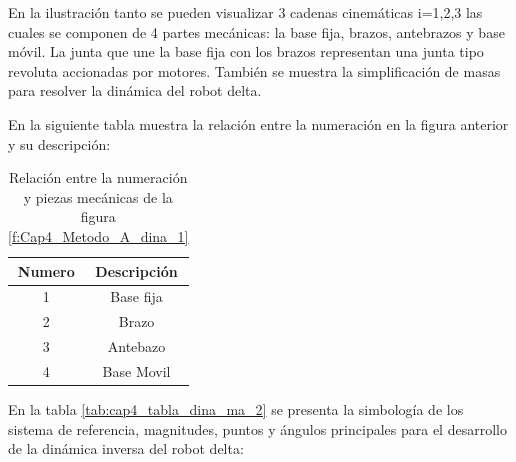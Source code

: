 En la ilustración tanto se pueden visualizar 3 cadenas cinemáticas i=1,2,3 las cuales se componen de 4 partes mecánicas: la base fija, brazos, antebrazos y base móvil. La junta que une la base fija con los brazos representan una junta tipo revoluta accionadas por motores. También se muestra la simplificación de masas para resolver la dinámica del robot delta.

En la siguiente tabla muestra la relación entre la numeración en la figura anterior y su descripción:


        \begin{table}[h]
            \centering
            \begin{tabular}{c c}
            \hline
                \textbf{Numero}& \textbf{Descripción} \\ 
            \hline             \hline
             1 & Base fija \\
            \hline
             2 & Brazo \\
            \hline
             3 & Antebazo \\
            \hline
             4 & Base Movil\\
            \hline
            \end{tabular}
            \caption{Relación entre la numeración y piezas mecánicas de la figura  \ref{f:Cap4_Metodo_A_dina_1}}           \label{tab:cap4_tabla_dina_ma_1}
        \end{table}

    \newpage
   
   En la tabla \ref{tab:cap4_tabla_dina_ma_2} se presenta la simbología de los sistema de referencia, magnitudes, puntos y ángulos principales para el desarrollo de la dinámica inversa del robot delta:
   
